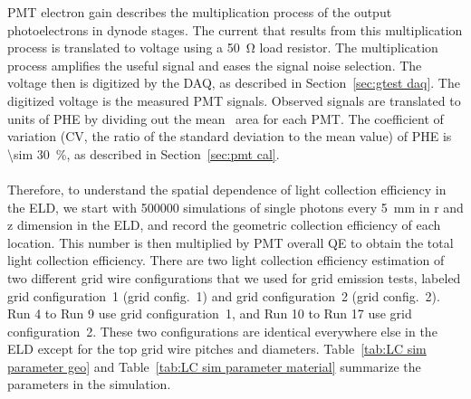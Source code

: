 PMT electron gain describes the multiplication process of the output photoelectrons in dynode stages. The current that results from this multiplication process is translated to voltage using a \SI{50}{\ohm} load resistor. The multiplication process amplifies the useful signal and eases the signal noise selection. The voltage then is digitized by the DAQ, as described in Section~\ref{sec:gtest daq}. The digitized voltage is the measured PMT signals. Observed signals are translated to units of PHE by dividing out the mean \sphe\ area for each PMT. %
The coefficient of variation (CV, the ratio of the standard deviation to the mean value) of PHE is \SI{\sim 30}{\percent}, as described in Section~\ref{sec:pmt cal}. 

\paragraph{}
Therefore, to understand the spatial dependence of light collection efficiency in the ELD, we start with \num{500000} simulations of single photons every \SI{5}{mm} in r and z dimension in the ELD, and record the geometric collection efficiency of each location. This number is then multiplied by PMT overall QE to obtain the total light collection efficiency. There are two light collection efficiency estimation of two different grid wire configurations that we used for grid emission tests, labeled grid configuration~1 (grid config.~1) and grid configuration~2 (grid config.~2). Run 4 to Run 9 use grid configuration~1, and Run 10 to Run 17 use grid configuration~2. These two configurations are identical everywhere else in the ELD except for the top grid wire pitches and diameters. Table~\ref{tab:LC sim parameter geo} and Table~\ref{tab:LC sim parameter material} summarize the parameters in the simulation.

